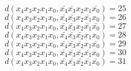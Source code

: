 \documentclass{basic}
\begin{document}
\(d(x_4 x_3 x_2 x_1 x_0, \bar{x_4} \bar{x_3} x_2 x_1 \bar{x_0}) = 25\)\\
\(d(x_4 x_3 x_2 x_1 x_0, \bar{x_4} \bar{x_3} x_2 \bar{x_1} x_0) = 26\)\\
\(d(x_4 x_3 x_2 x_1 x_0, \bar{x_4} \bar{x_3} x_2 \bar{x_1} \bar{x_0}) = 27\)\\
\(d(x_4 x_3 x_2 x_1 x_0, \bar{x_4} \bar{x_3} \bar{x_2} x_1 x_0) = 28\)\\
\(d(x_4 x_3 x_2 x_1 x_0, \bar{x_4} \bar{x_3} \bar{x_2} x_1 \bar{x_0}) = 29\)\\
\(d(x_4 x_3 x_2 x_1 x_0, \bar{x_4} \bar{x_3} \bar{x_2} \bar{x_1} x_0) = 30\)\\
\(d(x_4 x_3 x_2 x_1 x_0, \bar{x_4} \bar{x_3} \bar{x_2} \bar{x_1} \bar{x_0}) = 31\)\\
\end{document}
